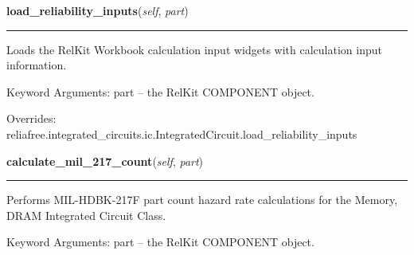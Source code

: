     \vspace{0.5ex}

\hspace{.8\funcindent}\begin{boxedminipage}{\funcwidth}

    \raggedright \textbf{load\_reliability\_inputs}(\textit{self}, \textit{part})

    \vspace{-1.5ex}

    \rule{\textwidth}{0.5\fboxrule}
\setlength{\parskip}{2ex}
    Loads the RelKit Workbook calculation input widgets with calculation
    input information.

    Keyword Arguments: part -- the RelKit COMPONENT object.

\setlength{\parskip}{1ex}
      Overrides: reliafree.integrated\_circuits.ic.IntegratedCircuit.load\_reliability\_inputs

    \end{boxedminipage}

    \label{reliafree:integrated_circuits:memory:MemoryDRAM:calculate_mil_217_count}

    \vspace{0.5ex}

\hspace{.8\funcindent}\begin{boxedminipage}{\funcwidth}

    \raggedright \textbf{calculate\_mil\_217\_count}(\textit{self}, \textit{part})

    \vspace{-1.5ex}

    \rule{\textwidth}{0.5\fboxrule}
\setlength{\parskip}{2ex}
    Performs MIL-HDBK-217F part count hazard rate calculations for the 
    Memory, DRAM Integrated Circuit Class.

    Keyword Arguments: part -- the RelKit COMPONENT object.

\setlength{\parskip}{1ex}
    \end{boxedminipage}

    \label{reliafree:integrated_circuits:memory:MemoryDRAM:calculate_mil_217_stress}

